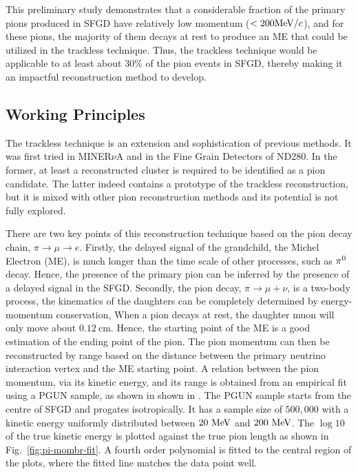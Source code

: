           This preliminary study demonstrates that a considerable fraction of the primary pions produced in SFGD have relatively low momentum ($<200\textrm{MeV}/c$), and for these pions, the majority of them decays at rest to produce an ME that could be utilized in the trackless technique.
          Thus, the trackless technique would be applicable to at least about $30\%$ of the pion events in SFGD, thereby making it an impactful reconstruction method to develop.

       \subsection{Working Principles}
       \label{sec:tl-wp}
         The trackless technique is an extension and sophistication of previous methods. 
         It was first tried in MINER$\nu$A\cite{MINERVAPOSTER} and in the Fine Grain Detectors of ND280\cite{T2KPOSTER}. 
         In the former, at least a reconstructed cluster is required to be identified as a pion candidate. 
         The latter indeed contains a prototype of the trackless reconstruction, but it is mixed with other pion reconstruction methods and its potential is not fully explored. 
    
         There are two key points of this reconstruction technique based on the pion decay chain, $\pi \rightarrow \mu \rightarrow e$.
         Firstly, the delayed signal of the grandchild, the Michel Electron (ME), is much longer than the time scale of other processes, such as $\pi^0$ decay.
         Hence, the presence of the primary pion can be inferred by the presence of a delayed signal in the SFGD.
         Secondly, the pion decay, $\pi \rightarrow \mu + \nu$, is a two-body process, the kinematics of the daughters can be completely determined by energy-momentum conservation, 
         When a pion decays at rest, the daughter muon will only move about $0.12~\textrm{cm}$. Hence, the starting point of the ME is a good estimation of the ending point of the pion.
         The pion momentum can then be reconstructed by range based on the distance between the primary neutrino interaction vertex and the ME starting point. 
         A relation between the pion momentum, via its kinetic energy, and its range is obtained from an empirical fit using a PGUN sample, as shown in shown in .
          The PGUN sample starts from the centre of SFGD and progates isotropically.
          It has a sample size of $500,000$ with a kinetic energy uniformly distributed between $20~\textrm{MeV}$ and $200~\textrm{MeV}$.
          The $\log10$ of the true kinetic energy is plotted against the true pion length as shown in Fig.~\ref{fig:pi-mombr-fit}.
          A fourth order polynomial is fitted to the central region of the plots, where the fitted line matches the data point well.

